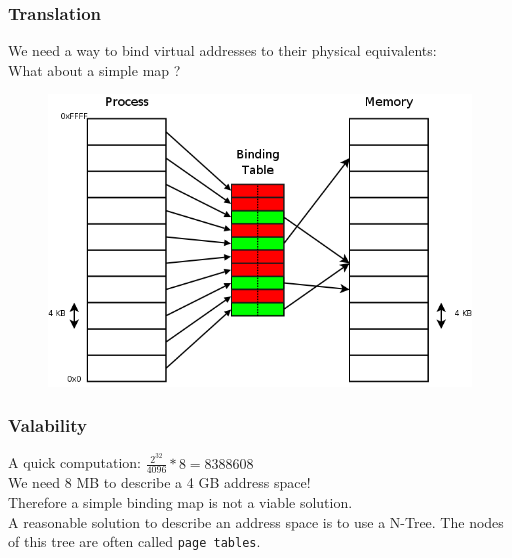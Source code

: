 \documentclass{beamer}
\begin{document}
\begin{frame}
  \frametitle{Translation}

  We need a way to bind virtual addresses to their physical equivalents:\\
  What about a simple map ?

  \begin{figure}
  \includegraphics[scale=0.25]{bind.png}
  \end{figure}
\end{frame}

\begin{frame}
  \frametitle{Valability}

  A quick computation: $\frac{2^{32}}{4096} * 8 = 8388608$\\
  We need 8 MB to describe a 4 GB address space!\\
  Therefore a simple binding map is not a viable solution.\\
  \vspace{10pt}
  A reasonable solution to describe an address space is to use a N-Tree. The nodes of this tree are often called \texttt{page tables}.
\end{frame}
\end{document}
